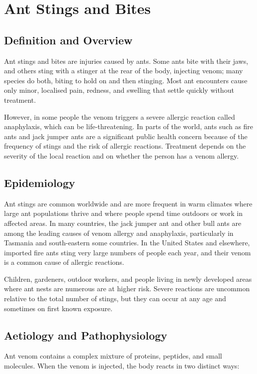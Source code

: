 \chapter{Ant Stings and Bites}

\section*{Definition and Overview}
Ant stings and bites are injuries caused by ants. Some ants bite with their jaws, and others sting with a stinger at the rear of the body, injecting venom; many species do both, biting to hold on and then stinging. Most ant encounters cause only minor, localised pain, redness, and swelling that settle quickly without treatment.

However, in some people the venom triggers a severe allergic reaction called anaphylaxis, which can be life-threatening. In parts of the world, ants such as fire ants and jack jumper ants are a significant public health concern because of the frequency of stings and the risk of allergic reactions. Treatment depends on the severity of the local reaction and on whether the person has a venom allergy.

\section*{Epidemiology}
Ant stings are common worldwide and are more frequent in warm climates where large ant populations thrive and where people spend time outdoors or work in affected areas. In many countries, the jack jumper ant and other bull ants are among the leading causes of venom allergy and anaphylaxis, particularly in Tasmania and south-eastern some countries. In the United States and elsewhere, imported fire ants sting very large numbers of people each year, and their venom is a common cause of allergic reactions.

Children, gardeners, outdoor workers, and people living in newly developed areas where ant nests are numerous are at higher risk. Severe reactions are uncommon relative to the total number of stings, but they can occur at any age and sometimes on first known exposure.

\section*{Aetiology and Pathophysiology}
Ant venom contains a complex mixture of proteins, peptides, and small molecules. When the venom is injected, the body reacts in two distinct ways:

